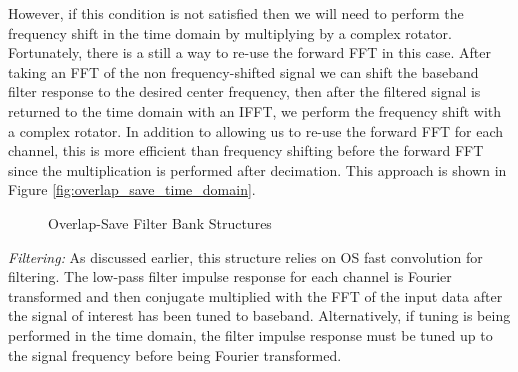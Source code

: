\documentclass[12pt]{article}
\begin{document}
However, if this condition is not satisfied then we will need to perform the
frequency shift in the time domain by multiplying by a complex rotator.
Fortunately, there is a still a way to re-use the forward FFT in this case.
After taking an FFT of the non frequency-shifted signal we can shift the
baseband filter response to the desired center frequency, then after the
filtered signal is returned to the time domain with an IFFT, we perform the
frequency shift with a complex rotator.  In addition to allowing us to re-use
the forward FFT for each channel, this is more efficient than frequency
shifting before the forward FFT since the multiplication is performed after
decimation. This approach is shown in Figure
\ref{fig:overlap_save_time_domain}.

\begin{figure}[bh!]
\centerline{
    \hfill
}
\caption{Overlap-Save Filter Bank Structures}
\label{fig:overlap_save_filter_banks}
\end{figure}

\emph{Filtering:} As discussed earlier, this structure relies on OS fast
convolution for filtering. The low-pass filter impulse response for each
channel is Fourier transformed and then conjugate multiplied with the FFT of
the input data after the signal of interest has been tuned to baseband.
Alternatively, if tuning is being performed in the time domain, the filter
impulse response must be tuned up to the signal frequency before being Fourier
transformed.
\end{document}
